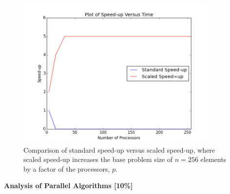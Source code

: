 \documentclass{article}\usepackage[]{graphicx}\usepackage[]{color}
\makeatletter
\newenvironment{kframe}{%
 \def\at@end@of@kframe{}%
 \ifinner\ifhmode%
  \def\at@end@of@kframe{\end{minipage}}%
  \begin{minipage}{\columnwidth}%
 \fi\fi%
 \def\FrameCommand##1{\hskip\@totalleftmargin \hskip-\fboxsep
 \colorbox{shadecolor}{##1}\hskip-\fboxsep
     \hskip-\linewidth \hskip-\@totalleftmargin \hskip\columnwidth}%
 \MakeFramed {\advance\hsize-\width
   \@totalleftmargin\z@ \linewidth\hsize
   \@setminipage}}%
 {\par\unskip\endMakeFramed%
 \at@end@of@kframe}
\newenvironment{knitrout}{}{} %
\newcommand{\1}{\mathop{\mathds{1}}}
\makeatother
\begin{document}
\begin{enumerate}[label=\arabic*., start=2]
\begin{enumerate}
\begin{knitrout}
\begin{kframe}
\begin{alltt}
\end{alltt}
\end{kframe}
\end{knitrout}
\begin{figure}[H]
  \centering
    \includegraphics[width=0.9\textwidth]{figures/speedup2.png}
    \caption{Comparison of standard speed-up versus scaled speed-up, where scaled speed-up increases the base problem size of $n=256$ elements by a factor of the processors, $p$.}

  \end{figure}
\end{enumerate}

{\huge \item \textbf{Analysis of Parallel Algorithms [10\%]}}\\




\end{enumerate}
\end{document}

